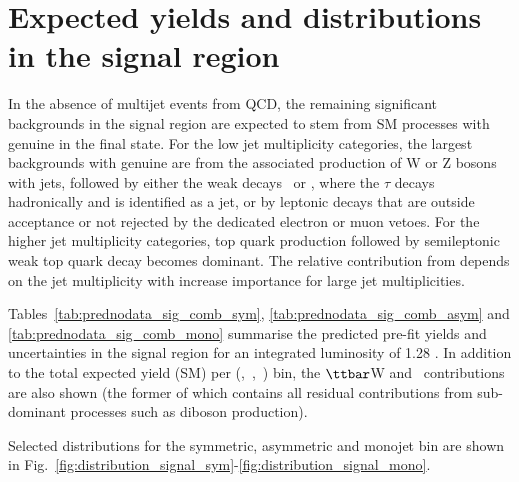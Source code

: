\section{Expected yields and distributions in the signal region}

In the absence of multijet events from QCD, the remaining significant backgrounds in the signal region are expected to stem from SM
processes with genuine \met in the final state. For the low jet multiplicity categories, the largest backgrounds with genuine \met are
from the associated production of W or Z bosons with jets, followed by either the weak decays \znunu\ or \wtaunu, where the $\tau$ decays
hadronically and is identified as a jet, or by leptonic decays that are outside acceptance or not rejected by the dedicated electron or
muon vetoes. For the higher jet multiplicity categories, top quark production followed by semileptonic weak top quark decay becomes
dominant. The relative contribution from \ttbar depends on the jet multiplicity with increase importance for large jet multiplicities.

Tables~\ref{tab:prednodata_sig_comb_sym},
\ref{tab:prednodata_sig_comb_asym} and \ref{tab:prednodata_sig_comb_mono} 
summarise the predicted pre-fit yields and uncertainties in the signal region for an integrated
luminosity of 1.28 \ifb. In addition to the total expected yield (SM) per (\njet,~\nb,~\scalht) bin, the $\ttbar$W and \znunu\ contributions
are also shown (the former of which contains all residual contributions from sub-dominant processes such as \eg diboson
production).
\clearpage

\clearpage

\clearpage



Selected distributions for the symmetric, asymmetric and monojet bin are shown in Fig.~\ref{fig:distribution_signal_sym}-\ref{fig:distribution_signal_mono}.

\clearpage

